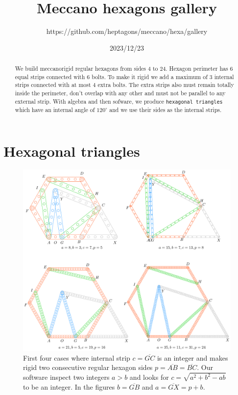 \documentclass[11pt]{article}
\title{Meccano hexagons gallery}
\author{https://github.com/heptagons/meccano/hexa/gallery}
\date{2023/12/23}
\begin{document}
\maketitle
\begin{abstract}
We build meccano\meccanoref rigid regular hexagons from sides $4$ to $24$. Hexagon perimeter has $6$ equal strips connected with $6$ bolts. To make it rigid we add a maximum of $3$ internal strips connected with at most $4$ extra bolts. The extra strips also must remain totally inside the perimeter, don't overlap with any other and must not be parallel to any external strip. With algebra and then sofware, we produce \texttt{hexagonal triangles} which have an internal angle of $120^\circ$ and we use their sides as the internal strips.
\end{abstract}

\section{Hexagonal triangles}

\begin{figure}[h]
\centering
\includegraphics[scale=0.9]{build/hexa-builder-a}
\caption{First four cases where internal strip $c = \overline{GC}$ is an integer and makes rigid two consecutive regular hexagon sides $p = \overline{AB} = \overline{BC}$. Our software inspect two integers $a > b$ and looks for $c = \sqrt{a^2+b^2-ab}$ to be an integer. In the figures $b = \overline{GB}$ and $a = \overline{GX} = p + b$. }
\label{fig:builder-a}
\end{figure}
\end{document}

